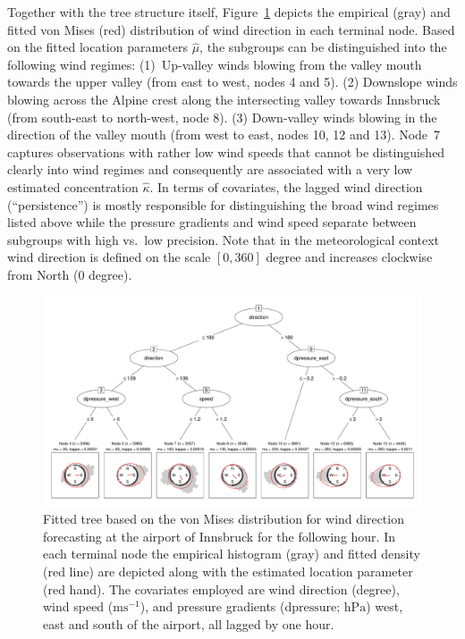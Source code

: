 \documentclass[nojss]{jss}
\numberwithin{equation}{section}
\begin{document}
Together with the tree structure itself, Figure~\ref{fig:tree_ibk} depicts the 
empirical (gray) and fitted von Mises (red) distribution of wind direction in each terminal 
node. Based on the fitted location parameters $\hat \mu$, the subgroups can be distinguished 
into the following wind regimes:
(1)~Up-valley winds blowing from the valley mouth towards the upper valley (from
east to west, nodes 4 and 5). 
(2) Downslope winds blowing across the Alpine crest along the intersecting valley towards 
Innsbruck (from south-east to north-west, node 8). 
(3) Down-valley winds blowing in the direction of the valley mouth (from west to east, 
nodes 10, 12 and 13). 
Node~7 captures observations with rather low wind speeds that cannot be distinguished
clearly into wind regimes and consequently are associated with a very low estimated 
concentration $\hat \kappa$. In terms of covariates, the lagged wind direction 
(``persistence'') is mostly responsible for distinguishing the broad wind regimes 
listed above while the pressure gradients and wind speed separate between subgroups 
with high vs.\ low precision. Note that in the meteorological context wind direction 
is defined on the scale $[0,360]$ degree and increases clockwise from North ($0$ degree).
  
\begin{figure}[t]
\centering
\includegraphics[width = \textwidth]{_plot_circforest_finalexampletree_ibk_lag1_v14.pdf}
\caption{Fitted tree based on the von Mises distribution for wind direction forecasting 
at the airport of Innsbruck for the following hour.
In each terminal node the empirical histogram (gray) and fitted density (red line)
are depicted along with the estimated location parameter (red hand). The covariates
employed are wind direction (degree), wind speed ($\text{ms}^{-1}$),
and pressure gradients ($\text{dpressure; hPa}$) west, east and south of the airport,
all lagged by one hour.}
\label{fig:tree_ibk} 
\end{figure}
\end{document}
